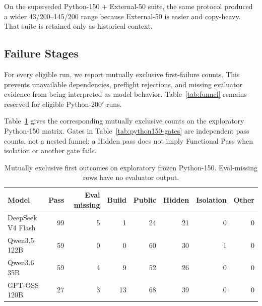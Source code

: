 \documentclass[acmsmall,anonymous,review,screen]{acmart}
\begin{document}
On the superseded Python-150 + External-50 suite, the same protocol produced a
wider 43/200--145/200 range because External-50 is easier and copy-heavy. That
suite is retained only as historical context.

\subsection{Failure Stages}

For every eligible run, we report mutually exclusive first-failure counts.
This prevents unavailable dependencies, preflight rejections, and missing
evaluator evidence from being interpreted as model behavior.
Table~\ref{tab:funnel} remains reserved for eligible Python-200$'$ runs.

\begin{table}[t]
  \caption{Planned mutually exclusive outcome table for eligible
  Python-200$'$ runs.}
  \label{tab:funnel}
  \centering
\end{table}

Table~\ref{tab:python150-firstfail} gives the corresponding mutually exclusive
counts on the exploratory Python-150 matrix. Gates in
Table~\ref{tab:python150-gates} are independent pass counts, not a nested
funnel: a Hidden pass does not imply Functional Pass when isolation or another
gate fails.

\begin{table}[t]
  \caption{Mutually exclusive first outcomes on exploratory frozen Python-150.
  Eval-missing rows have no evaluator output.}
  \label{tab:python150-firstfail}
  \centering
  \begin{tabular}{lrrrrrrr}
  \toprule
  \textbf{Model} & \textbf{Pass} & \textbf{Eval missing} & \textbf{Build} & \textbf{Public} & \textbf{Hidden} & \textbf{Isolation} & \textbf{Other} \\
  \midrule
  DeepSeek V4 Flash & 99 & 5 & 1 & 24 & 21 & 0 & 0 \\
  Qwen3.5 122B & 59 & 0 & 0 & 60 & 30 & 1 & 0 \\
  Qwen3.6 35B & 59 & 4 & 9 & 52 & 26 & 0 & 0 \\
  GPT-OSS 120B & 27 & 3 & 13 & 68 & 39 & 0 & 0 \\
  \bottomrule
  \end{tabular}
\end{table}
\end{document}
